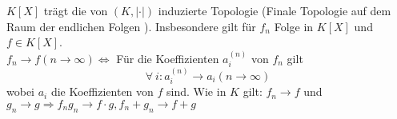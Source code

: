 \begin{Bem}[Vorbemerkung]
$K[X]$ trägt die von $(K, | \cdot|)$ induzierte Topologie (\glqq Finale Topologie auf dem Raum der endlichen Folgen \grqq). Insbesondere gilt für $f_n$ Folge in $K[X]$ und $f \in K[X]$.\\
$f_n \to f (n \to \infty) \iff $ Für die Koeffizienten $a_i^{(n)}$ von $f_n$ gilt
\[\forall \ i : a_i^{(n)} \to a_i (n \to \infty)\]
wobei $a_i$ die Koeffizienten von $f$ sind. Wie in $K$ gilt: $f_n \to f$ und $g_n \to g \Rightarrow f_n g_n \to f\cdot g, f_n+g_n \to f+g$
\end{Bem}
